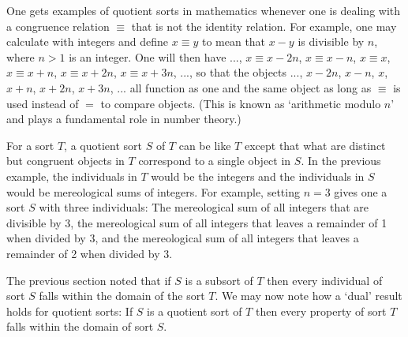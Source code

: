 \documentclass[12pt]{book}
\begin{document}
One gets examples of quotient sorts in mathematics whenever one is dealing with a congruence relation $\equiv$ that is not the identity relation. For example, one may calculate with integers and define $x \equiv y$ to mean that $x - y$ is divisible by $n$, where $n > 1$ is an integer. One will then have ..., $x \equiv x - 2n$, $x \equiv x - n$, $x \equiv x$, $x \equiv x + n$, $x \equiv x + 2n$, $x \equiv x + 3n$, ..., so that the objects ..., $x - 2n$, $x - n$, $x$, $x + n$, $x + 2n$, $x + 3n$, ... all function as one and the same object as long as $\equiv$ is used instead of $=$ to compare objects. (This is known as `arithmetic modulo $n$' and plays a fundamental role in number theory.)

For a sort $T$, a quotient sort $S$ of $T$ can be like $T$ except that what are distinct but congruent objects in $T$ correspond to a single object in $S$. In the previous example, the individuals in $T$ would be the integers and the individuals in $S$ would be mereological sums of integers. For example, setting $n=3$ gives one a sort $S$ with three individuals: The mereological sum of all integers that are divisible by 3, the mereological sum of all integers that leaves a remainder of 1 when divided by 3, and the mereological sum of all integers that leaves a remainder of 2 when divided by 3.

The previous section noted that if $S$ is a subsort of $T$ then every individual of sort $S$ falls within the domain of the sort $T$. We may now note how a `dual' result holds for quotient sorts: If $S$ is a quotient sort of $T$ then every property of sort $T$ falls within the domain of sort $S$.
\end{document}
